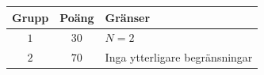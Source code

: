 
\begin{center}
\begin{tabular}{| c | c | l |}
  \hline
  \textbf{Grupp} & \textbf{Poäng} & \textbf{Gränser} \\ \hline
  $1$    & $30$  & $N = 2$ \\ \hline
  $2$    & $70$  & Inga ytterligare begränsningar \\ \hline
\end{tabular}
\end{center}

